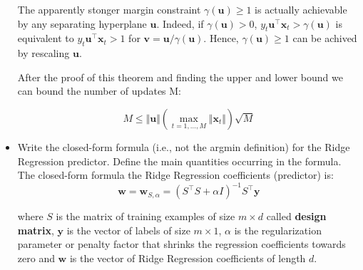 \begin{itemize}
        The apparently stonger margin constraint $\gamma (\boldsymbol{u}) \geq 1$ is actually achievable by any separating hyperplane $\boldsymbol{u}$. Indeed, if $\gamma (\boldsymbol{u}) > 0$, $y_t\boldsymbol{u}^\top\boldsymbol{x}_t > \gamma (\boldsymbol{u})$ is equivalent to $y_t\boldsymbol{u}^\top\boldsymbol{x}_t > 1$ for $\boldsymbol{v} = \boldsymbol{u} / \gamma (\boldsymbol{u})$. Hence, $\gamma(\boldsymbol{u}) \geq 1$ can be achived by rescaling $\boldsymbol{u}$.
         

        After the proof of this theorem and finding the upper and lower bound we can bound the number of updates M:

        $$
        M \leq \Vert \boldsymbol{u} \Vert \left(\underset{t = 1, \dots, M}{\max} \Vert \boldsymbol{x}_t \Vert \right) \sqrt{M} 
        $$

    \item Write the closed-form formula (i.e., not the argmin definition) for the Ridge Regression predictor. Define the main quantities occurring in the formula.\\

        The closed-form formula the Ridge Regression coefficients (predictor) is:
        $$
        \boldsymbol{w} = \boldsymbol{w}_{S, \alpha} = (S^{\top} S + \alpha I)^{-1}S^{\top}\boldsymbol{y}
        $$
   
        where $S$ is the matrix of training examples of size $m \times d$ called \textbf{design matrix}, $\boldsymbol{y}$ is the vector of labels of size $m \times 1$, $\alpha$ is the regularization parameter or penalty factor that shrinks the regression coefficients towards zero and $\boldsymbol{w}$ is the vector of Ridge Regression coefficients of length $d$.\\


\end{itemize}

